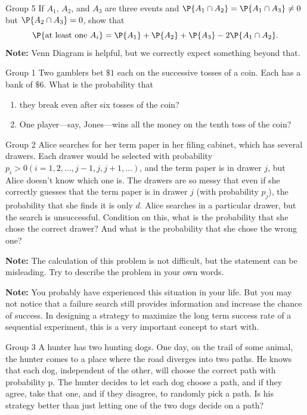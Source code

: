 \documentclass{article}
\theoremstyle{plain}
\theoremstyle{definition}
\theoremstyle{remark}
\begin{document}
\begin{problem}
    {Group 5}
    If $A_1$, $A_2$, and $A_3$ are three events and $\P{A_1\cap A_2}=\P{A_1\cap A_3}\neq0$ but $\P{A_2\cap A_3}=0$, show that
    \[\P{\text{at least one}\ A_i}=\P{A_1}+\P{A_2}+\P{A_3}-2\P{A_1\cap A_2}.\]
    \textbf{Note:} Venn Diagram is helpful, but we correctly expect something beyond that.
\end{problem}
\begin{problem}
    {Group 1}
    Two gamblers bet $\$1$ each on the successive tosses of a coin. Each has a bank of $\$6$. What is the probability that
    \begin{enumerate}
        \item they break even after six tosses of the coin?
        \item One player—say, Jones—wins all the money on the tenth toss of the coin?
    \end{enumerate}
\end{problem}

\begin{problem}
    {Group 2}
    Alice searches for her term paper in her filing cabinet, which has several drawers. Each drawer would be selected with probability $p_i>0 (i=1,2,\ldots,j-1,j,j+1,\ldots)$, and the term paper is in drawer $j$, but Alice doesn't know which one is. The drawers are so messy that even if she correctly guesses that the term paper is in drawer $j$ (\ie with probability $p_j$), the probability that she finds it is only $d$. Alice searches in a particular drawer, but the search is unsuccessful. Condition on this, what is the probability that she chose the correct drawer? And what is the probability that she chose the wrong one?

    \textbf{Note:} The calculation of this problem is not difficult, but the statement can be misleading. Try to describe the problem in your own words.

    \textbf{Note:} You probably have experienced this situation in your life. But you may not notice that a failure search still provides information and increase the chance of success. In designing a strategy to maximize the long term success rate of a sequential experiment, this is a very important concept to start with.
\end{problem}

\begin{problem}
    {Group 3}
    A hunter has two hunting dogs. One day, on the trail of some animal, the hunter comes to a place where the road diverges into two paths. He knows that each dog, independent of the other, will choose the correct path with probability p. The hunter decides to let each dog choose a path, and if they agree, take that one, and if they disagree, to randomly pick a path. Is his strategy better than just letting one of the two dogs decide on a path?
\end{problem}
\end{document}
